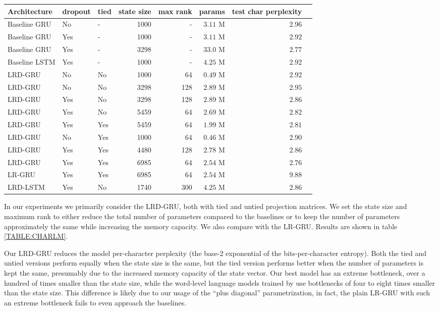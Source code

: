 \documentclass[11pt,a4paper]{article}
\begin{document}
\begin{table*}[t]
\caption{Character-level language modeling results}
\centering
\begin{tabular}{lllrrrrr}
\toprule
Architecture & dropout & tied & state size & max rank & params & test char perplexity \\
\midrule
Baseline GRU & No & - & 1000 & - & $3.11$ M & $2.96$ \\
Baseline GRU & Yes & - & 1000 & - & $3.11$ M & $2.92$ \\
Baseline GRU & Yes & - & 3298 & - & $33.0$ M & $2.77$ \\
Baseline LSTM & Yes & - & 1000 & - & $4.25$ M & $2.92$ \\
\midrule
LRD-GRU  & No & No & 1000 & 64 & $0.49$ M & $2.92$\\
LRD-GRU  & No & No & 3298 & 128 & $2.89$ M & $2.95$\\
LRD-GRU  & Yes & No & 3298 & 128 & $2.89$ M & $2.86$\\
LRD-GRU  & Yes & No & 5459 & 64 & $2.69$ M & $2.82$\\
LRD-GRU  & Yes & Yes & 5459 & 64 & $1.99$ M & $2.81$\\
LRD-GRU  & No & Yes & 1000 & 64 & $0.46$ M & $2.90$\\
LRD-GRU  & Yes & Yes & 4480 & 128 & $2.78$ M & $2.86$\\
LRD-GRU  & Yes & Yes & 6985 & 64 & $2.54$ M & $\mathbf{2.76}$\\
LR-GRU  & Yes & Yes & 6985 & 64 & $2.54$ M & $9.88$\\
LRD-LSTM & Yes & No & 1740 & 300 & $4.25$ M & $2.86$\\
\bottomrule
\end{tabular}
\label{TABLE:CHARLM}
\end{table*}

In our experiments we primarily consider the LRD-GRU, both with tied and untied projection matrices. We set the state size and maximum rank to either reduce the total number of parameters compared to the baselines or to keep the number of parameters approximately the same while increasing the memory capacity. We also compare with the LR-GRU. Results are shown in table \ref{TABLE:CHARLM}.

Our LRD-GRU reduces the model per-character perplexity (the base-2 exponential of the bits-per-character entropy). Both the tied and untied versions perform equally when the state size is the same, but the tied version performs better when the number of parameters is kept the same, presumably due to the increased memory capacity of the state vector.
Our best model has an extreme bottleneck, over a hundred of times smaller than the state size, while the word-level language models trained by  use bottlenecks of four to eight times smaller than the state size.
This difference is likely due to our usage of the ``plus diagonal'' parametrization, in fact, the plain LR-GRU with such an extreme bottleneck fails to even approach the baselines.
\end{document}

